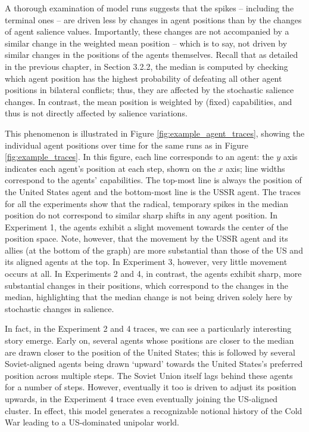 A thorough examination of model runs suggests that the spikes -- including the terminal ones -- are driven less by changes in agent positions than by the changes of agent salience values. Importantly, these changes are not accompanied by a similar change in the weighted mean position -- which is to say, not driven by similar changes in the positions of the agents themselves. Recall that as detailed in the previous chapter, in Section 3.2.2, the median is computed by checking which agent position has the highest probability of defeating all other agent positions in bilateral conflicts; thus, they are affected by the stochastic salience changes. In contrast, the mean position is weighted by (fixed) capabilities, and thus is not directly affected by salience variations.

This phenomenon is illustrated in Figure \ref{fig:example_agent_traces}, showing the individual agent positions over time for the same runs as in Figure \ref{fig:example_traces}. In this figure, each line corresponds to an agent: the $y$ axis indicates each agent's position at each step, shown on the $x$ axis; line widths correspond to the agents' capabilities. The top-most line is always the position of the United States agent and the bottom-most line is the USSR agent. The traces for all the experiments show that the radical, temporary spikes in the median position do not correspond to similar sharp shifts in any agent position. In Experiment 1, the agents exhibit a slight movement towards the center of the position space. Note, however, that the movement by the USSR agent and its allies (at the bottom of the graph) are more substantial than those of the US and its aligned agents at the top. In Experiment 3, however, very little movement occurs at all. In Experiments 2 and 4, in contrast, the agents exhibit sharp, more substantial changes in their positions, which correspond to the changes in the median, highlighting that the median change is not being driven solely here by stochastic changes in salience.

In fact, in the Experiment 2 and 4 traces, we can see a particularly interesting story emerge. Early on, several agents whose positions are closer to the median are drawn closer to the position of the United States; this is followed by several Soviet-aligned agents being drawn `upward' towards the United States's preferred position across multiple steps. The Soviet Union itself lags behind these agents for a number of steps. However, eventually it too is driven to adjust its position upwards, in the Experiment 4 trace even eventually joining the US-aligned cluster. In effect, this model generates a recognizable notional history of the Cold War leading to a US-dominated unipolar world. 

